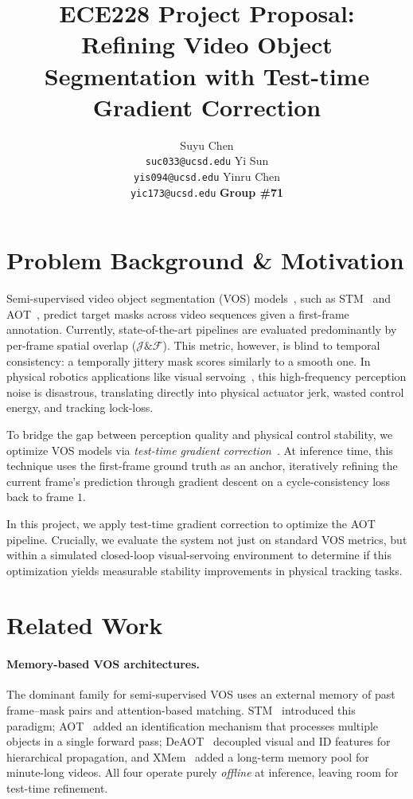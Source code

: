 \documentclass{article}
\title{ECE228 Project Proposal:\\
Refining Video Object Segmentation with Test-time Gradient Correction}
\author{%
  Suyu Chen \\
  \texttt{suc033@ucsd.edu}
  \And
  Yi Sun \\
  \texttt{yis094@ucsd.edu}
  \And
  Yinru Chen\\
  \texttt{yic173@ucsd.edu}
  \AND
  \textbf{Group \#71}
}
\begin{document}
\maketitle


\section{Problem Background \& Motivation}

Semi-supervised video object segmentation (VOS) models~\citep{pont2017davis}, such as STM~\citep{oh2019stm} and AOT~\citep{yang2021aot}, predict target masks across video sequences given a first-frame annotation. Currently, state-of-the-art pipelines are evaluated predominantly by per-frame spatial overlap ($\mathcal{J}\&\mathcal{F}$). This metric, however, is blind to temporal consistency: a temporally jittery mask scores similarly to a smooth one. In physical robotics applications like visual servoing~\citep{chaumette2006visual}, this high-frequency perception noise is disastrous, translating directly into physical actuator jerk, wasted control energy, and tracking lock-loss.

To bridge the gap between perception quality and physical control stability, we optimize VOS models via \emph{test-time gradient correction}~\citep{li2020cycle}. At inference time, this technique uses the first-frame ground truth as an anchor, iteratively refining the current frame's prediction through gradient descent on a cycle-consistency loss back to frame $1$.

In this project, we apply test-time gradient correction to optimize the AOT~\citep{yang2021aot} pipeline. Crucially, we evaluate the system not just on standard VOS metrics, but within a simulated closed-loop visual-servoing environment to determine if this optimization yields measurable stability improvements in physical tracking tasks.

\section{Related Work}

\paragraph{Memory-based VOS architectures.}
The dominant family for semi-supervised VOS uses an external memory of
past frame--mask pairs and attention-based matching.
STM~\citep{oh2019stm} introduced this paradigm; AOT~\citep{yang2021aot}
added an identification mechanism that processes multiple objects in a
single forward pass; DeAOT~\citep{yang2022deaot} decoupled visual and
ID features for hierarchical propagation, and
XMem~\citep{cheng2022xmem} added a long-term memory pool for
minute-long videos.  All four operate purely \emph{offline} at
inference, leaving room for test-time refinement.
\end{document}
